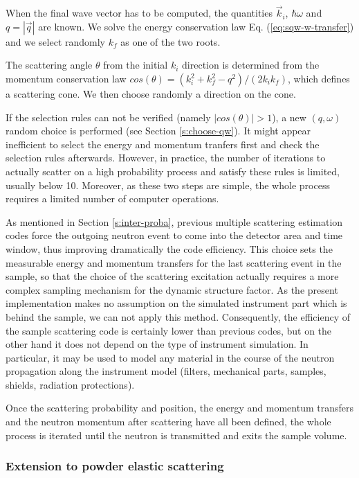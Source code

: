 When the final wave vector has to be computed, the quantities $\vec{k}_i$, $\hbar \omega$ and $q = |\vec{q}|$ are known.
We solve the energy conservation law Eq. (\ref{eq:sqw-w-transfer}) and we select randomly $k_f$ as one of the two roots.

The scattering angle $\theta$ from the initial $k_i$ direction is determined from the momentum conservation law $cos(\theta) = (k_i^2 + k_f^2 - q^2)/(2k_i k_f)$, which defines a scattering cone. We then choose randomly a direction on the cone.

If the selection rules can not be verified (namely $|cos(\theta)| > 1$), a new $(q,\omega)$ random choice is performed (see Section \ref{s:choose-qw}).
It might appear inefficient to select the energy and momentum tranfers first and check the selection rules afterwards. However, in practice, the number of iterations to actually scatter on a high probability process and satisfy these rules is limited, usually below 10. Moreover, as these two steps are simple, the whole process requires a limited number of computer operations.

As mentioned in Section \ref{s:inter-proba}, previous multiple scattering estimation codes \cite{msc,mscat,discus} force the outgoing neutron event to come into the detector area and time window, thus improving dramatically the code efficiency. This choice sets the measurable energy and momentum transfers for the last scattering event in the sample, so that the choice of the scattering excitation actually requires a more complex sampling mechanism for the dynamic structure factor. As the present implementation makes no assumption on the simulated instrument part which is behind the sample, we can not apply this method. Consequently, the efficiency of the sample scattering code is certainly lower than previous codes, but on the other hand it does not depend on the type of instrument simulation. In particular, it may be used to model any material in the course of the neutron propagation along the instrument model (filters, mechanical parts, samples, shields, radiation protections).

Once the scattering probability and position, the energy and momentum transfers and the neutron momentum after scattering have all been defined, the whole process is iterated until the neutron is transmitted and exits the sample volume.

\subsubsection{Extension to powder elastic scattering}

